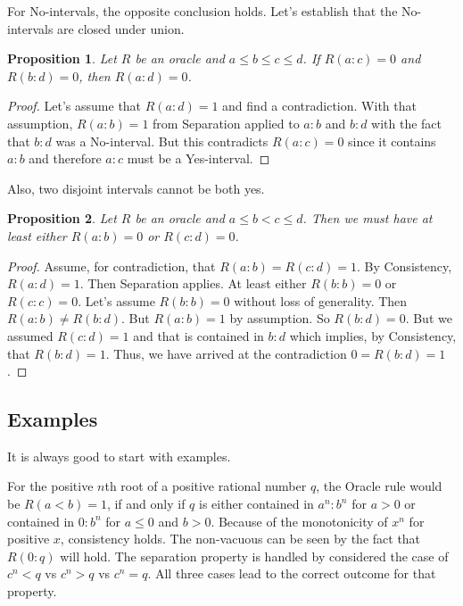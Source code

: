 \documentclass[12pt]{article}
\newtheorem{proposition}{Proposition}
\theoremstyle{remark}
\begin{document}
For No-intervals, the opposite conclusion holds. Let's establish that the No-intervals are closed under union. 

\begin{proposition}
Let $R$ be an oracle and $a \leq b \leq c \leq d$.  If $R(a:c) = 0$ and $R(b:d) = 0$, then $R(a:d) = 0$. 
\end{proposition}

\begin{proof}
    Let's assume that $R(a:d) = 1$ and find a contradiction. With that assumption, $R(a:b) = 1$ from Separation applied to $a:b$ and $b:d$ with the fact that $b:d$ was a No-interval. But this contradicts $R(a:c)= 0$ since it contains $a:b$ and therefore $a:c$ must be a Yes-interval.
\end{proof}

Also, two disjoint intervals cannot be both yes. 

\begin{proposition}
Let $R$ be an oracle and $a \leq b < c \leq d$. Then we must have at least either $R(a:b) = 0$ or $R(c:d) = 0$. 
\end{proposition}

\begin{proof}
Assume, for contradiction, that $R(a:b) = R(c:d) = 1$. By Consistency, $R(a:d) = 1$. Then Separation applies. At least either $R(b:b) = 0$ or $R(c:c) = 0$. Let's assume $R(b:b) = 0$ without loss of generality. Then $R(a:b) \neq R(b:d)$. But $R(a:b) = 1$ by assumption. So $R(b:d) = 0$. But we assumed $R(c:d) = 1$ and that is contained in $b:d$ which implies, by Consistency, that $R(b:d) = 1$. Thus, we have arrived at the contradiction $0 = R(b:d) = 1$. 
\end{proof}


\subsection{Examples}

It is always good to start with examples. 

For the positive $n$th root of a positive rational number $q$, the Oracle rule would be $R(a<b) = 1$, if and only if $q$ is either contained in $a^n:b^n$ for $a>0$ or contained in $0:b^n$ for $a \leq 0$ and $b>0$. Because of the monotonicity of $x^n$ for positive $x$, consistency holds. The non-vacuous can be seen by the fact that $R(0:q)$ will hold. The separation property is handled by considered the case of $c^n < q$ vs $c^n > q$ vs $c^n = q$. All three cases lead to the correct outcome for that property. 
\end{document}
